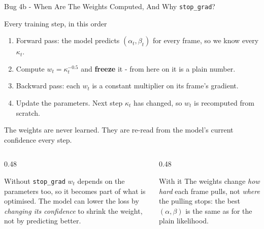 \documentclass[aspectratio=169]{beamer}
\begin{document}
	\begin{frame}{Bug 4b - When Are The Weights Computed, And Why \texttt{stop\_grad}?}
		\begin{block}{Every training step, in this order}
			\small
			\begin{enumerate}
				\item Forward pass: the model predicts $(\alpha_t, \beta_t)$ for every frame, so we know every $\kappa_t$.
				\item Compute $w_t = \kappa_t^{-0.5}$ and \textbf{freeze} it - from here on it is a plain number.
				\item Backward pass: each $w_t$ is a constant multiplier on its frame's gradient.
				\item Update the parameters. Next step $\kappa_t$ has changed, so $w_t$ is recomputed from scratch.
			\end{enumerate}
			The weights are never learned. They are re-read from the model's current confidence every step.
		\end{block}
		\begin{columns}[onlytextwidth]
			\begin{column}{0.48\textwidth}
				\begin{alertblock}{Without \texttt{stop\_grad}}
					\small
					$w_t$ depends on the parameters too, so it becomes part of what is optimised.
					The model can lower the loss by \emph{changing its confidence} to shrink the
					weight, not by predicting better.
				\end{alertblock}
			\end{column}
			\begin{column}{0.48\textwidth}
				\begin{block}{With it}
					\small
					The weights change \emph{how hard} each frame pulls, not \emph{where} the
					pulling stops: the best $(\alpha, \beta)$ is the same as for the plain likelihood.
				\end{block}
			\end{column}
		\end{columns}
	\end{frame}
\end{document}
